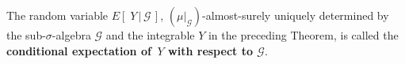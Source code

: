 \begin{theorem}
\end{theorem}

\begin{remark}\mbox{}\vskip 0.1cm\noindent
The random variable $E\!\left[\;Y\,\vert\,\mathcal{G}\,\right]$,
$(\mu\vert_{\mathcal{G}})$-almost-surely uniquely determined by
the sub-$\sigma$-algebra $\mathcal{G}$ and the integrable $Y$
in the preceding Theorem,
is called the
\textbf{\color{red}conditional expectation of \,$Y$ with respect to $\mathcal{G}$}.
\end{remark}

